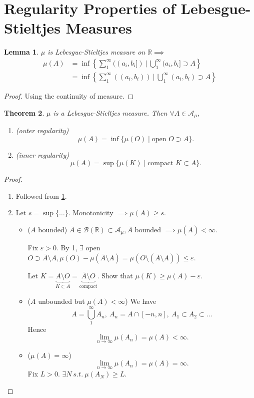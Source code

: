 \documentclass{report}
\newcommand{\R}{\mathbb{R}}
\newcommand{\st}{\ s.t.\ }
\newtheorem{theorem}{Theorem}[chapter]
\newtheorem{lemma}[theorem]{Lemma}
\theoremstyle{definition}
\theoremstyle{remark}
\begin{document}
\section{Regularity Properties of Lebesgue-Stieltjes Measures}
\begin{lemma}\label{le:LSreal}
$\mu$ is Lebesgue-Stieltjes measure on $\R \implies$ 
\begin{align*}
    \mu(A) & = \inf\left\{\sum_1^\infty((a_i, b_i])\ \biggr\vert\ \bigcup_1^\infty(a_i, b_i] \supset A\right\} \\
           & =\inf\left\{
\sum_1^\infty((a_i, b_i))\ \biggr\vert\ \bigcup_1^\infty(a_i, b_i) \supset A\right\}
\end{align*}
\end{lemma}
\begin{proof}
	Using the continuity of measure.
\end{proof}

\begin{theorem}
	$\mu$ is a Lebesgue-Stieltjes measure. Then $\forall A \in \mathcal{A}_\mu$,
	\begin{enumerate}
		\item (outer regularity) \[
			\mu(A) = \inf\{\mu(O) \mid \text{open } O \supset A\}.	
		\]
		\item (inner regularity) \[
			\mu(A) = \sup\{\mu(K) \mid \text{compact } K \subset A\}.
		\]
	\end{enumerate}
\end{theorem}
\begin{proof}
	\begin{enumerate}
		\item Followed from \ref{le:LSreal}.
		\item Let $s = \sup\{\ldots\}$. 
		Monotonicity $\implies \mu(A) \geq s$.
		\begin{itemize}
			\item ($A$ bounded)
			$\overline{A} \in \mathcal{B}(\R) \subset \mathcal{A}_\mu, \overline{A}$ bounded $\implies \mu(\overline{A}) < \infty$.

			Fix $\varepsilon > 0$. By 1, $\exists$ open $O \supset \overline{A} \setminus A, \mu(O) - \mu(\overline{A} \setminus A) = \mu(O \setminus (\overline{A} \setminus A))\leq \varepsilon$.

			Let $K = \underbrace{A \setminus O}_{K \subset A} = \underbrace{\overline{A} \setminus O}_{\text{compact}}$. Show that $\mu(K) \geq \mu(A) - \varepsilon$.

			\item ($A$ unbounded but $\mu(A) < \infty$)
			We have
			\[
				A = \bigcup_1^\infty A_n,\ A_n = A \cap [-n, n],\ A_1 \subset A_2 \subset \ldots	
			\]
			Hence \[
				\lim_{n \to \infty} \mu(A_n) = \mu(A) < \infty.
			\]

			\item ($\mu(A) = \infty$)
			\[
				\lim_{n \to \infty} \mu(A_n) = \mu(A) = \infty.
			\]
			Fix $L > 0$. $\exists N \st \mu(A_N) \geq L$. \qedhere
		\end{itemize}
	\end{enumerate}
\end{proof}
\end{document}

